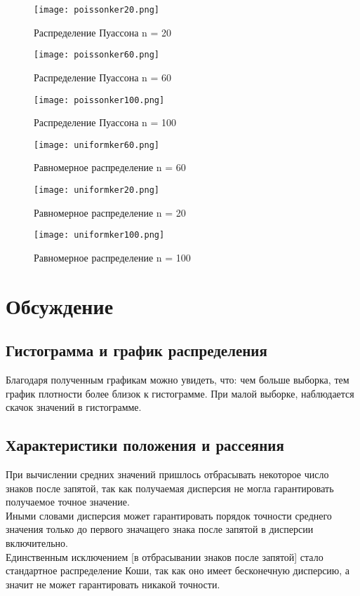 \documentclass[a4]{article}
\begin{document}
\begin{center}
\begin{figure}[h!]
			\end{figure}
			\newpage
			\begin{figure}[h!]
				\texttt{[image: poissonker20.png]}
				\caption[Распределение Пуассона n = 20]{Распределение Пуассона n = 20}
			\end{figure}
			\newpage
			\begin{figure}[h!]
				\texttt{[image: poissonker60.png]}
				\caption[Распределение Пуассона n = 60]{Распределение Пуассона n = 60}
			\end{figure}
			\newpage
			\begin{figure}[h!]
				\texttt{[image: poissonker100.png]}
				\caption[Распределение Пуассона n = 100]{Распределение Пуассона n = 100}
			\end{figure}
			\newpage
			\begin{figure}[h!]
				\texttt{[image: uniformker60.png]}
				\caption[Равномерное распределение n = 60]{Равномерное распределение n = 60}
			\end{figure}
			\newpage
			\begin{figure}[h!]
				\texttt{[image: uniformker20.png]}
				\caption[Равномерное распределение n = 20]{Равномерное распределение n = 20}
			\end{figure}
			\newpage
			\begin{figure}[h!]
				\texttt{[image: uniformker100.png]}
				\caption[Равномерное распределение n = 100]{Равномерное распределение n = 100}
			\end{figure}
			
		\end{center}
		
		\newpage
		
	\section{Обсуждение}
		\subsection{Гистограмма и график распределения}
		Благодаря полученным графикам можно увидеть, что: чем больше выборка, тем график плотности более близок к гистограмме. При малой выборке, наблюдается скачок значений в гистограмме.
		
		\subsection{Характеристики положения и рассеяния}
			При вычислении средних значений пришлось отбрасывать некоторое число знаков после запятой, так как получаемая дисперсия не могла гарантировать получаемое точное значение. \\
			Иными словами дисперсия может гарантировать порядок точности среднего значения только до первого значащего знака после запятой в дисперсии включительно.\\ Единственным исключением [в отбрасывании знаков после запятой] стало стандартное распределение Коши, так как оно имеет бесконечную дисперсию, а значит не может гарантировать никакой точности.
			
\end{document}
